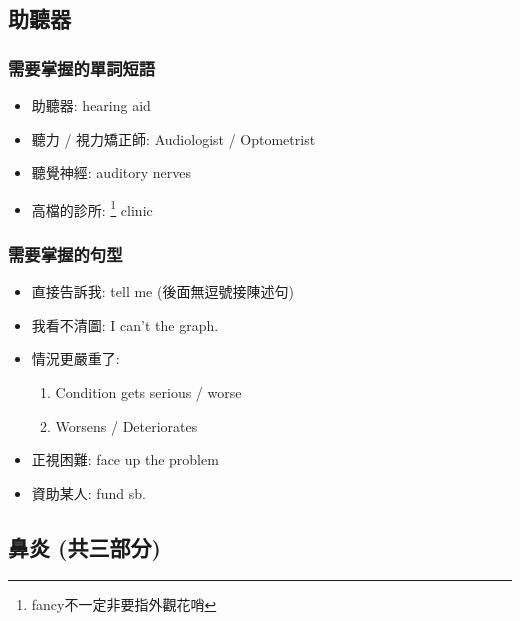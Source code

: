 \subsection{助聽器}
\subsubsection*{需要掌握的單詞短語}
\begin{itemize}
  \itemsep0em
  \item 助聽器: hearing aid
  \item 聽力 / 視力矯正師: Audiologist / Optometrist
  \item 聽覺神經: auditory nerves
  \item 高檔的診所: \footnote{fancy不一定非要指外觀花哨} clinic
\end{itemize}

\subsubsection*{需要掌握的句型}
\begin{itemize}
  \itemsep0em
  \item 直接告訴我: tell me  (後面無逗號接陳述句)
  \item 我看不清圖: I can't  the graph.
  \item 情況更嚴重了:
  \begin{enumerate}
    \itemsep0em
    \item Condition gets serious / worse
    \item Worsens / Deteriorates
  \end{enumerate}
  \item 正視困難: face up the problem
  \item 資助某人: fund sb.
\end{itemize}

\subsection{鼻炎 (共三部分)}
